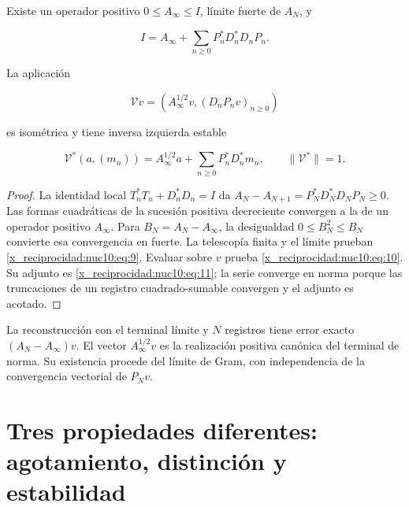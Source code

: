 \begin{theorem}
\label{x_reciprocidad:nuclear:terminal-no-estacionario}
Existe un operador positivo \(0\leq A_\infty\leq I\), límite fuerte de \(A_N\), y



\begin{equation}
\boxed{I=A_\infty+\sum_{n\ge0}P_n^*D_n^*D_nP_n.}
\label{x_reciprocidad:nuc10:eq:9}
\end{equation}



La aplicación



\begin{equation}
\boxed{\mathcal Vv=(A_\infty^{1/2}v,(D_nP_nv)_{n\ge0})}
\label{x_reciprocidad:nuc10:eq:10}
\end{equation}



es isométrica y tiene inversa izquierda estable



\begin{equation}
\mathcal V^*(a,(m_n))=A_\infty^{1/2}a+
\sum_{n\ge0}P_n^*D_n^*m_n,\qquad\|\mathcal V^*\|=1.
\label{x_reciprocidad:nuc10:eq:11}
\end{equation}



\end{theorem}
\begin{proof}
La identidad local \(T_n^*T_n+D_n^*D_n=I\) da
\(A_N-A_{N+1}=P_N^*D_N^*D_NP_N\geq0\). Las formas cuadráticas de
la sucesión positiva decreciente convergen a la de un operador positivo
\(A_\infty\). Para \(B_N=A_N-A_\infty\), la desigualdad
\(0\leq B_N^2\leq B_N\) convierte esa convergencia en fuerte.
La telescopía finita y el límite prueban \eqref{x_reciprocidad:nuc10:eq:9}. Evaluar sobre \(v\)
prueba \eqref{x_reciprocidad:nuc10:eq:10}. Su adjunto es \eqref{x_reciprocidad:nuc10:eq:11}; la serie converge en norma porque
las truncaciones de un registro cuadrado-sumable convergen y el adjunto es acotado.
\end{proof}

La reconstrucción con el terminal límite y \(N\) registros tiene error
exacto \((A_N-A_\infty)v\). El vector \(A_\infty^{1/2}v\) es la
realización positiva canónica del terminal de norma. Su existencia procede
del límite de Gram, con independencia de la convergencia vectorial de \(P_Nv\).

\section{Tres propiedades diferentes: agotamiento, distinción y estabilidad}

